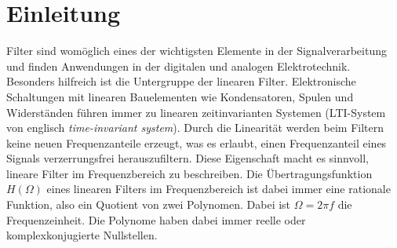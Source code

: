 \section{Einleitung}

Filter sind womöglich eines der wichtigsten Elemente in der Signalverarbeitung und finden Anwendungen in der digitalen und analogen Elektrotechnik.
Besonders hilfreich ist die Untergruppe der linearen Filter.
Elektronische Schaltungen mit linearen Bauelementen wie Kondensatoren, Spulen und Widerständen führen immer zu linearen zeitinvarianten Systemen (LTI-System von englisch {\em time-invariant system}).
%
%
Durch die Linearität werden beim Filtern keine neuen Frequenzanteile erzeugt, was es erlaubt, einen Frequenzanteil eines Signals verzerrungsfrei herauszufiltern.
Diese Eigenschaft macht es sinnvoll, lineare Filter im Frequenzbereich zu beschreiben.
Die Übertragungsfunktion $H(\Omega)$ eines linearen Filters im Frequenzbereich ist dabei immer eine rationale Funktion, also ein Quotient von zwei Polynomen.
%
Dabei ist $\Omega = 2 \pi f$ die Frequenzeinheit.
Die Polynome haben dabei immer reelle oder komplexkonjugierte Nullstellen.

